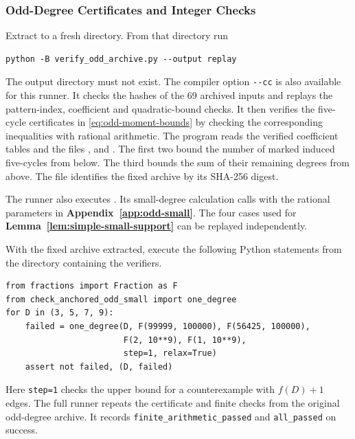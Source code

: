 \documentclass[preprint,11pt,numbers]{elsarticle-arxiv}
\numberwithin{equation}{section}
\theoremstyle{definition}
\begin{document}
\subsubsection{Odd-Degree Certificates and Integer Checks}

Extract 
to a fresh directory. From that directory run
\begin{verbatim}
python -B verify_odd_archive.py --output replay
\end{verbatim}
The output directory must not exist. The compiler option \verb|--cc|
is also available for this runner. It checks the hashes of the 69
archived inputs and replays the pattern-index, coefficient and
quadratic-bound checks. It then verifies the five-cycle certificates in
\eqref{eq:odd-moment-bounds} by checking the corresponding inequalities
with rational arithmetic. The program  reads
the verified coefficient tables and the files
,
 and
. The first two bound the
number of marked induced five-cycles from below. The third bounds the
sum of their remaining degrees from above. The file
 identifies the fixed archive by its
SHA-256 digest.

The runner also executes . Its small-degree
calculation calls  with the rational
parameters in \textbf{Appendix~\ref{app:odd-small}}. The four cases
used for \textbf{Lemma~\ref{lem:simple-small-support}} can be replayed
independently.

\noindent\begin{minipage}{\linewidth}
With the fixed archive extracted, execute the following Python statements
from the directory containing the verifiers.
\begin{verbatim}
from fractions import Fraction as F
from check_anchored_odd_small import one_degree
for D in (3, 5, 7, 9):
    failed = one_degree(D, F(99999, 100000), F(56425, 100000),
                        F(2, 10**9), F(1, 10**9),
                        step=1, relax=True)
    assert not failed, (D, failed)
\end{verbatim}
\end{minipage}\par
Here \verb|step=1| checks the upper bound for a counterexample with
$f(D)+1$ edges. The full runner repeats the certificate and finite
checks from the original odd-degree archive. It records
\verb|finite_arithmetic_passed| and \verb|all_passed| on success.
\end{document}
